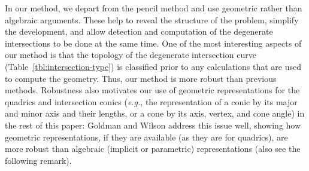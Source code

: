 In our method, we depart from the pencil method and use geometric rather
than algebraic arguments.
These help to reveal the structure of the problem, simplify the development,
and allow detection and computation of the degenerate intersections to
be done at the same time.
One of the most interesting aspects of our method is
that the topology of the degenerate intersection curve
(Table~\ref{tbl:intersection-type}) is classified prior to any calculations
that are used to compute the geometry.  Thus, our method is more robust than
previous methods.
Robustness also motivates our use
of geometric representations for the quadrics and intersection conics
({\em e.g.}, the representation of a conic by its major and minor axis
and their lengths, or a cone by its axis, vertex, and cone angle) in the
rest of this paper:
Goldman \cite{goldman:1983b} and Wilson \cite{wilson:1987} address this
issue well, showing how geometric representations, if they are available
(as they are for quadrics), are more robust than
algebraic (implicit or parametric) representations (also see the following
remark).



